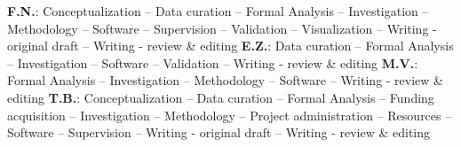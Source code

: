 \documentclass[11pt,preprint]{elsarticle}
\renewcommand{\ttdefault}{\sfdefault}
\begin{document}

\textbf{F.N.}:
Conceptualization --
Data curation --
Formal Analysis --
Investigation --
Methodology --
Software --
Supervision --
Validation --
Visualization --
Writing - original draft --
Writing - review \& editing
\textbf{E.Z.}:
Data curation --
Formal Analysis --
Investigation --
Software --
Validation --
Writing - review \& editing
\textbf{M.V.}:
Formal Analysis --
Investigation --
Methodology --
Software --
Writing - review \& editing
\textbf{T.B.}:
Conceptualization --
Data curation --
Formal Analysis --
Funding acquisition --
Investigation --
Methodology --
Project administration --
Resources --
Software --
Supervision --
Writing - original draft --
Writing - review \& editing

\renewcommand{\ttdefault}{\sfdefault}
%



\newpage

\makeatletter
\renewcommand \thesection{S\@arabic\c@section}
\renewcommand\thetable{S\@arabic\c@table}
\renewcommand \thefigure{S\@arabic\c@figure}
\makeatother

\renewcommand{\citenumfont}[1]{S#1}

\setcounter{equation}{0}
\setcounter{figure}{0}
\setcounter{table}{0}
\setcounter{section}{0}



\renewcommand{\ttdefault}{\sfdefault}

\newpage
\begin{small}
	\tableofcontents
\end{small}
\end{document}
